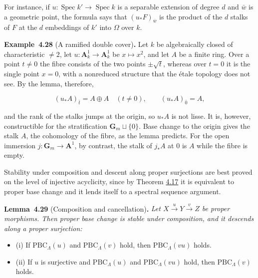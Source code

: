 \documentclass[11pt]{article}
\newenvironment{bpstatement}[2]{\par\addvspace{0.6\baselineskip}\noindent\textbf{#1}#2\textbf{.}\enspace\ignorespaces}
  {\par\addvspace{0.4\baselineskip}}
\newenvironment{bpstatementit}[2]{\begin{bpstatement}{#1}{#2}\itshape\ignorespaces}{\end{bpstatement}}
\begin{document}
\label{bp82}%
For instance, if \(u:\operatorname{Spec}k'\to\operatorname{Spec}k\) is a separable extension of degree \(d\) and \(\bar w\) is a geometric point, the formula says that \((u_*F)_{\bar w}\) is the product of the \(d\) stalks of \(F\) at the \(d\) embeddings of \(k'\) into \(\Omega\) over \(k\).

\label{bp83}%
\begin{bpstatement}{Example~4.28}{ (A ramified double cover)}
Let \(k\) be algebraically closed of characteristic \(\neq2\), let \(u:\mathbf A^1_k\to\mathbf A^1_k\) be \(x\mapsto x^2\), and let \(A\) be a finite ring. Over a point \(t\neq0\) the fibre consists of the two points \(\pm\sqrt t\), whereas over \(t=0\) it is the single point \(x=0\), with a nonreduced structure that the étale topology does not see. By the lemma, therefore,

\[
(u_*A)_{\bar t}=A\oplus A\quad(t\neq0),\qquad (u_*A)_{\bar0}=A,
\]

and the rank of the stalks jumps at the origin, so \(u_*A\) is not lisse. It is, however, constructible for the stratification \(\mathbf G_m\sqcup\{0\}\). Base change to the origin gives the stalk \(A\), the cohomology of the fibre, as the lemma predicts. For the open immersion \(j:\mathbf G_m\to\mathbf A^1\), by contrast, the stalk of \(j_*A\) at \(0\) is \(A\) while the fibre is empty.
\end{bpstatement}

\label{bp84}%
Stability under composition and descent along proper surjections are best proved on the level of injective acyclicity, since by Theorem \hyperref[bp45]{4.17} it is equivalent to proper base change and it lends itself to a spectral sequence argument.

\label{bp85}%
\begin{bpstatementit}{Lemma~4.29}{ (Composition and cancellation)}
Let \(X\xrightarrow{u}Y\xrightarrow{v}Z\) be proper morphisms. Then proper base change is stable under composition, and it descends along a proper surjection:

\begin{itemize}
\item (i) If \(\mathrm{PBC}_\Lambda(u)\) and \(\mathrm{PBC}_\Lambda(v)\) hold, then \(\mathrm{PBC}_\Lambda(vu)\) holds.
\item (ii) If \(u\) is surjective and \(\mathrm{PBC}_\Lambda(u)\) and \(\mathrm{PBC}_\Lambda(vu)\) hold, then \(\mathrm{PBC}_\Lambda(v)\) holds.
\end{itemize}
\end{bpstatementit}
\end{document}

